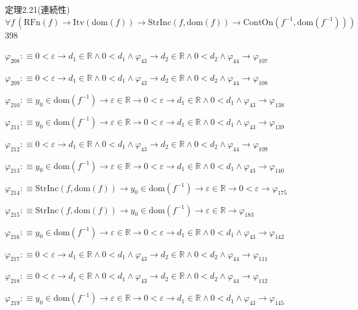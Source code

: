 \begin{fullproof}{定理2.21(連続性)}{$\forall f\,(\mathrm{RFn}(f) \to \mathrm{Itv}(\mathrm{dom}(f)) \to \mathrm{StrInc}(f,\mathrm{dom}(f)) \to \mathrm{ContOn}(f^{-1},\mathrm{dom}(f^{-1})))$}{398}
\begin{abbrevlist}
\item $\varphi_{208} :\equiv 0 < \varepsilon \to d_{1} \in \mathbb{R} \land 0 < d_{1} \land \varphi_{43} \to d_{2} \in \mathbb{R} \land 0 < d_{2} \land \varphi_{44} \to \varphi_{107}$
\item $\varphi_{209} :\equiv 0 < \varepsilon \to d_{1} \in \mathbb{R} \land 0 < d_{1} \land \varphi_{43} \to d_{2} \in \mathbb{R} \land 0 < d_{2} \land \varphi_{44} \to \varphi_{108}$
\item $\varphi_{210} :\equiv y_{0} \in \mathrm{dom}(f^{-1}) \to \varepsilon \in \mathbb{R} \to 0 < \varepsilon \to d_{1} \in \mathbb{R} \land 0 < d_{1} \land \varphi_{43} \to \varphi_{138}$
\item $\varphi_{211} :\equiv y_{0} \in \mathrm{dom}(f^{-1}) \to \varepsilon \in \mathbb{R} \to 0 < \varepsilon \to d_{1} \in \mathbb{R} \land 0 < d_{1} \land \varphi_{43} \to \varphi_{139}$
\item $\varphi_{212} :\equiv 0 < \varepsilon \to d_{1} \in \mathbb{R} \land 0 < d_{1} \land \varphi_{43} \to d_{2} \in \mathbb{R} \land 0 < d_{2} \land \varphi_{44} \to \varphi_{109}$
\item $\varphi_{213} :\equiv y_{0} \in \mathrm{dom}(f^{-1}) \to \varepsilon \in \mathbb{R} \to 0 < \varepsilon \to d_{1} \in \mathbb{R} \land 0 < d_{1} \land \varphi_{43} \to \varphi_{140}$
\item $\varphi_{214} :\equiv \mathrm{StrInc}(f,\mathrm{dom}(f)) \to y_{0} \in \mathrm{dom}(f^{-1}) \to \varepsilon \in \mathbb{R} \to 0 < \varepsilon \to \varphi_{175}$
\item $\varphi_{215} :\equiv \mathrm{StrInc}(f,\mathrm{dom}(f)) \to y_{0} \in \mathrm{dom}(f^{-1}) \to \varepsilon \in \mathbb{R} \to \varphi_{183}$
\item $\varphi_{216} :\equiv y_{0} \in \mathrm{dom}(f^{-1}) \to \varepsilon \in \mathbb{R} \to 0 < \varepsilon \to d_{1} \in \mathbb{R} \land 0 < d_{1} \land \varphi_{43} \to \varphi_{142}$
\item $\varphi_{217} :\equiv 0 < \varepsilon \to d_{1} \in \mathbb{R} \land 0 < d_{1} \land \varphi_{43} \to d_{2} \in \mathbb{R} \land 0 < d_{2} \land \varphi_{44} \to \varphi_{111}$
\item $\varphi_{218} :\equiv 0 < \varepsilon \to d_{1} \in \mathbb{R} \land 0 < d_{1} \land \varphi_{43} \to d_{2} \in \mathbb{R} \land 0 < d_{2} \land \varphi_{44} \to \varphi_{112}$
\item $\varphi_{219} :\equiv y_{0} \in \mathrm{dom}(f^{-1}) \to \varepsilon \in \mathbb{R} \to 0 < \varepsilon \to d_{1} \in \mathbb{R} \land 0 < d_{1} \land \varphi_{43} \to \varphi_{145}$

\end{abbrevlist}
\end{fullproof}
